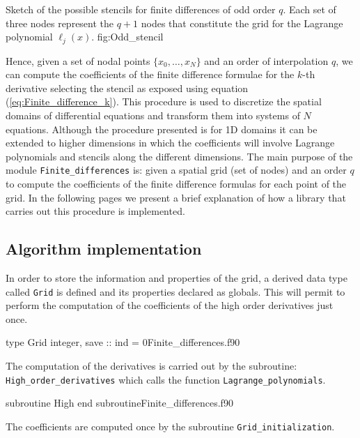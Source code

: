     \onegraphw
    {\OddStencil}
    {Sketch of the possible stencils for finite differences of odd order $q$. Each set of three nodes represent the $q+1$ nodes that 
constitute the grid for the Lagrange polynomial $\ell_j(x)$.}
    {fig:Odd_stencil}
    
    Hence, given a set of nodal points $\{x_0,\ldots,x_N\}$ and an order of interpolation $q$, we can compute the coefficients of the finite difference formulae for the $k$-th derivative selecting the stencil as exposed using equation (\ref{eq:Finite_difference_k}). This procedure is used to discretize the spatial domains of differential equations and transform them into systems of $N$ equations. Although the procedure presented is for 1D domains it can be extended to higher dimensions in which the coefficients will involve Lagrange polynomials and stencils along the different dimensions. The main purpose of the module \verb|Finite_differences| is: given a spatial grid (set of nodes) and an order $q$ to compute the coefficients of the finite difference formulas for each point of the grid. In the following pages we present a brief explanation of how a library that carries out this procedure is implemented.
    
    \newpage
    \subsection{Algorithm implementation}
    
    In order to store the information and properties of the grid, a derived data type called \verb|Grid| is defined and its properties declared as globals. This will permit to perform the computation of the coefficients of the high order derivatives just once.
    
    \vspace{0.5cm} 
    {type Grid}
    {integer, save :: ind = 0}{Finite_differences.f90}
  
     The computation of the derivatives is carried out by the subroutine: \\
     \verb|High_order_derivatives| which calls the function \verb|Lagrange_polynomials|.
     
     \vspace{0.5cm} 
     {subroutine High}
     {end subroutine}{Finite_differences.f90}
    
    \newpage 
    The coefficients are computed once by the subroutine \verb|Grid_initialization|.
    \vspace{0.5cm} 
    
